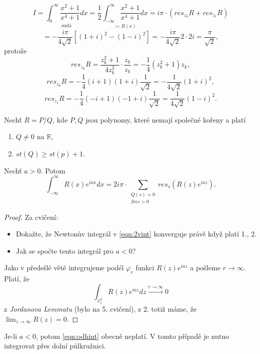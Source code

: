 \begin{example}
$$I=\underset{\text{sudá}}{\int_0^\infty{\frac{x^2+1}{x^4+1}}dx}
=\frac{1}{2}\underset{:=R(x)}{\int_{-\infty}^\infty\frac{x^2+1}
{x^4+1}dx}=i\pi\cdot(res_{z_0}R+res_{z_1}R)$$
$$=-\frac{i\pi}{4\sqrt{2}}\left[(1+i)^2-(1-i)^2\right]=-\frac{i\pi}{4\sqrt{2}}2\cdot 2i=\frac{\pi}{\sqrt{2}},$$ protože
$${res}_{z_k}R=\frac{z_k^2+1}{4z^3_k}\cdot\frac{z_k}{z_k}=
-\frac{1}{4}(z_k^2+1)z_k,$$
$${res}_{z_0}R=-\frac{1}{4}(i+1)(1+i)\frac{1}{\sqrt{2}}=-\frac{1}{4\sqrt{2}}(1+i)^2,$$
$${res}_{z_1}R=-\frac{1}{4}(-i+1)(-1+i)\frac{1}{\sqrt{2}}=\frac{1}{4\sqrt{2}}(1-i)^2.$$
\end{example}

\begin{theorem}
Nechť $R=P/Q$, kde $P,Q$ jsou polynomy, které nemají společné kořeny a platí
\begin{enumerate}
    \item $Q\neq 0$ na $\mathbb{R}$,
    \item $st(Q)\geq st(p)+1$.
\end{enumerate}
Nechť $a>0$. Potom
\begin{equation}
    \label{eqn:2vint}
    \int_{-\infty}^\infty{R(x)e^{iax}}dx = 2i\pi\cdot\sum_{\begin{array}{cc}
         Q(s)=0  \\
         {Im}{s}>0 
    \end{array}}{res_s\left({R(z)e^{iaz}}\right)}.
\end{equation}
\end{theorem}
\begin{proof}
Za cvičení:
\begin{itemize}
    \item Dokažte, že Newtonův integrál v \cref{eqn:2vint} konverguje právě když platí 1., 2.
    \item Jak se spočte tento integrál pro $a<0$?
\end{itemize}
Jako v předešlé větě integrujeme podél $\varphi_r$ funkci $R(z)e^{iaz}$ a pošleme $r\to\infty$. Platí, že
\begin{equation}
    \int_{\varphi_r^2}{R(z)e^{iaz}}dz\overset{r\to\infty}{\longrightarrow}0
    \label{eqn:odhint}
\end{equation}
z \textit{Jordanova Lemmatu} (bylo na 5. cvičení), z 2. totiž máme, že $\lim_{z\to\infty}R(z)=0$.
\end{proof}

\begin{note}
Je-li $a<0$, potom \cref{eqn:odhint} obecně neplatí. V tomto případě je nutno integrovat přes dolní půlkružnici.
\end{note}

